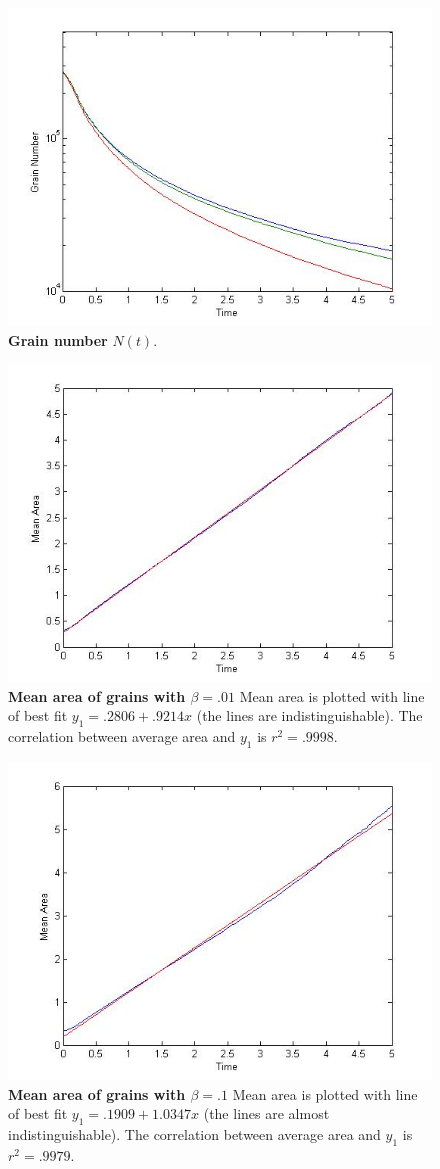  
\clearpage{}

\begin{figure}
   \begin{centering}     
\includegraphics[width=.5\textwidth]{grainnumber.jpg}
        \caption{\textbf{Grain number} $N(t)$.}\label{grainnumber}
        \end{centering}
  \end{figure}

 \begin{figure}
 \begin{centering}
  \includegraphics[width=.5\textwidth]{meanregareazero.jpg}
\caption{\textbf{Mean area of grains with $\beta = .01$} Mean area is plotted with line of best fit $y_1 = .2806+.9214x$  (the lines are indistinguishable). The correlation between average area and $y_1$ is $r^2= .9998$. }\label{av1}
\end{centering}
\end{figure}

\begin{figure}
  \begin{centering}
\includegraphics[width=.5\textwidth]{meanregareatenth.jpg}
\caption{\textbf{Mean area of grains with $\beta = .1$} Mean area is plotted with line of best fit $y_1 = .1909+1.0347x$   (the lines are almost indistinguishable). The correlation between average area and $y_1$ is $r^2= .9979$. }\label{av2}
\end{centering}
\end{figure}


